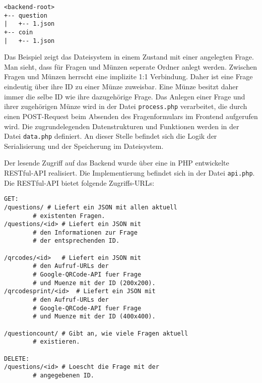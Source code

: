 \begin{verbatim}
<backend-root>
+-- question
|   +-- 1.json
+-- coin
|   +-- 1.json
\end{verbatim}

Das Beispiel zeigt das Dateisystem in einem Zustand mit einer angelegten Frage. Man sieht, dass für Fragen und Münzen seperate Ordner anlegt werden. Zwischen Fragen und Münzen herrscht eine implizite 1:1 Verbindung. Daher ist eine Frage eindeutig über ihre ID zu einer Münze zuweisbar. Eine Münze besitzt daher immer die selbe ID wie ihre dazugehörige Frage.
Das Anlegen einer Frage und ihrer zugehörigen Münze wird in der Datei \texttt{process.php} verarbeitet, die durch einen POST-Request beim Absenden des Fragenformulars im Frontend aufgerufen wird. Die zugrundelegenden Datenstrukturen und Funktionen werden in der Datei \texttt{data.php} definiert. An dieser Stelle befindet sich die Logik der Serialisierung und der Speicherung im Dateisystem.

Der lesende Zugriff auf das Backend wurde über eine in PHP entwickelte RESTful-API realisiert. Die Implementierung befindet sich in der Datei \texttt{api.php}.
Die RESTful-API bietet folgende Zugriffs-URLs:

 \begin{lstlisting}
GET:
/questions/	# Liefert ein JSON mit allen aktuell
		# existenten Fragen.
/questions/<id>	# Liefert ein JSON mit
		# den Informationen zur Frage
		# der entsprechenden ID.

/qrcodes/<id>	# Liefert ein JSON mit
		# den Aufruf-URLs der
		# Google-QRCode-API fuer Frage
		# und Muenze mit der ID (200x200).
/qrcodesprint/<id>	# Liefert ein JSON mit
		# den Aufruf-URLs der
		# Google-QRCode-API fuer Frage
		# und Muenze mit der ID (400x400).

/questioncount/	# Gibt an, wie viele Fragen aktuell
		# existieren.

DELETE:
/questions/<id>	# Loescht die Frage mit der
		# angegebenen ID.
\end{lstlisting}

%
%
%

